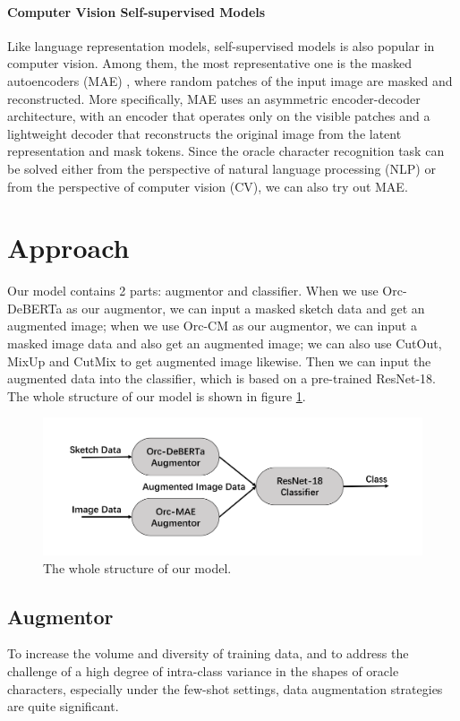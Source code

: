 \documentclass{article}
\begin{document}
\paragraph{Computer Vision Self-supervised Models}
Like language representation models, self-supervised models is also popular in computer vision. 
Among them, the most representative one is the masked autoencoders (MAE) \citep{MAE}, where random patches of the input image are masked and reconstructed.
More specifically, MAE uses an asymmetric encoder-decoder architecture, with an encoder that operates only on the visible  patches and a lightweight decoder that reconstructs the original image from the latent representation and mask tokens.  
Since the oracle character recognition task can be solved either  from the perspective of natural language processing (NLP) or from the perspective of computer vision (CV), we can also try out MAE.

\section{Approach}

Our model contains 2 parts: augmentor and classifier. When we use Orc-DeBERTa as our augmentor, we can input a masked sketch data and get an augmented image; when we use Orc-CM as our augmentor, we can input a masked image data and also get an augmented image; we can also use CutOut, MixUp and CutMix to get augmented image likewise. Then we can input the augmented data into the classifier, which is based on a pre-trained ResNet-18. The whole structure of our model is shown in figure \ref{fig:whole}.

\begin{figure}[h]
	\centering
	\includegraphics[width=0.75\linewidth]{../Graph/whole.png}
	\caption{The whole structure of our model.}
	\label{fig:whole}
\end{figure}

\subsection{Augmentor}
To increase the volume and diversity of training data, and to address the challenge of a high degree of intra-class variance in the shapes of oracle characters, especially under the few-shot settings, data augmentation strategies are quite significant. 
\end{document}
